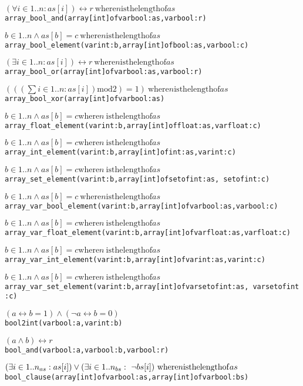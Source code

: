\documentclass[a4paper]{article}
\begin{document}
% 
\begin{alltt}
\((\forall i\in{}1..n: as[i]) \leftrightarrow r\
\mathrm{ where} n \mathrm{is the length of} as\)
array_bool_and(array [int] of var bool: as, var bool: r)

\(b\in{}1..n \wedge as[b] = c\
\mathrm{ where} n \mathrm{is the length of} as\)
array_bool_element(var int: b, array [int] of bool: as, var bool: c)

\((\exists i\in{}1..n: as[i]) \leftrightarrow r\
\mathrm{ where} n \mathrm{is the length of} as\)
array_bool_or(array [int] of var bool: as, var bool: r)

\((((\sum i\in{}1..n: as[i]) \mathrm{mod} 2) = 1)\
\mathrm{ where} n \mathrm{is the length of} as\)
array_bool_xor(array [int] of var bool: as)

\(b\in{}1..n \wedge as[b] = c \mathrm{ where} n\
\mathrm{is the length of} as\)
array_float_element(var int: b, array [int] of float: as, var float: c)

\(b\in{}1..n \wedge as[b] = c \mathrm{ where} n\
\mathrm{is the length of} as\)
array_int_element(var int: b, array [int] of int: as, var int: c)

\(b\in{}1..n \wedge as[b] = c \mathrm{ where} n\
\mathrm{is the length of} as\)
array_set_element(var int: b, array [int] of set of int: as, \
set of int: c)

\(b\in{}1..n \wedge as[b] = c\
\mathrm{ where} n \mathrm{is the length of} as\)
array_var_bool_element(var int: b, array [int] of var bool: as, var bool: c)

\(b\in{}1..n \wedge as[b] = c \mathrm{ where} n\
\mathrm{is the length of} as\)
array_var_float_element(var int: b, array [int] of var float: as, var float: c)

\(b\in{}1..n \wedge as[b] = c \mathrm{ where} n\
\mathrm{is the length of} as\)
array_var_int_element(var int: b, array [int] of var int: as, var int: c)

\(b\in{}1..n \wedge as[b] = c \mathrm{ where} n\
\mathrm{is the length of} as\)
array_var_set_element(var int: b, array [int] of var set of int: as, \
var set of int: c)

\((a \leftrightarrow b=1) \wedge (\neg{}a \leftrightarrow b=0)\)
bool2int(var bool: a, var int: b)

\((a \wedge b) \leftrightarrow r\)
bool_and(var bool: a, var bool: b, var bool: r)

\((\exists i\in{}1..n\sb{as}: as[i]) \vee (\exists i\in1..n\sb{bs}: \
\neg{}bs[i])\
\mathrm{ where} n \mathrm{is the length of} as\)
bool_clause(array [int] of var bool: as, array [int] of var bool: bs)


\end{alltt}
\end{document}
